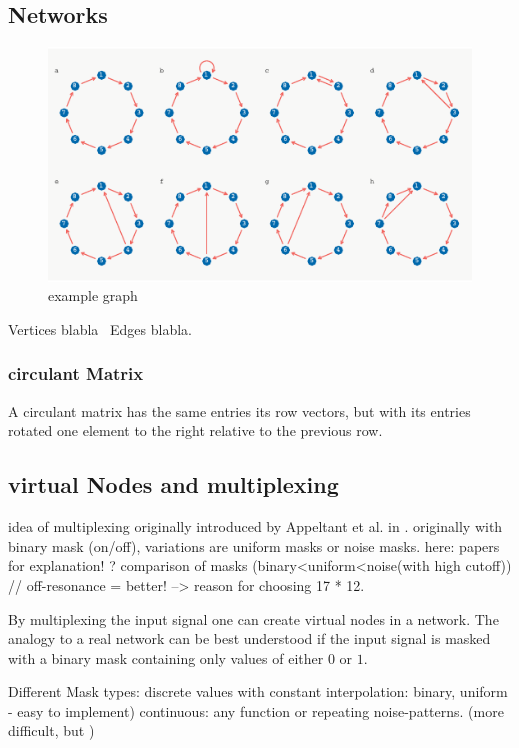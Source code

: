 \subsection{Networks}

	\begin{figure}
		\centering
		\includegraphics[width=12cm]{pics/graph_plot}
		\caption{example graph}
		\label{fig:example_graph}
	\end{figure}

Vertices blabla \
Edges blabla. \

	\subsubsection{circulant Matrix}
    A circulant matrix has the same entries its row vectors, but with its entries rotated one element to the right relative to the previous row.

    
\subsection{virtual Nodes and multiplexing}
	idea of multiplexing originally introduced by Appeltant et al. in \cite{APP11}. 
	originally with binary mask (on/off), variations are uniform masks or noise masks.
	here: papers for explanation!
	\cite{KUR18}?
	\cite{APP14} comparison of masks (binary<uniform<noise(with high cutoff))
	\cite{STE20} // off-resonance = better! --> reason for choosing 17 * 12.
	
	By multiplexing the input signal one can create virtual nodes in a network. The analogy to a real network can be best understood if the input signal is masked with a binary mask containing only values of either $0$ or $1$.
	
	Different Mask types: discrete values with constant interpolation: binary, uniform - easy to implement)
	continuous: any function or repeating noise-patterns. (more difficult, but )

